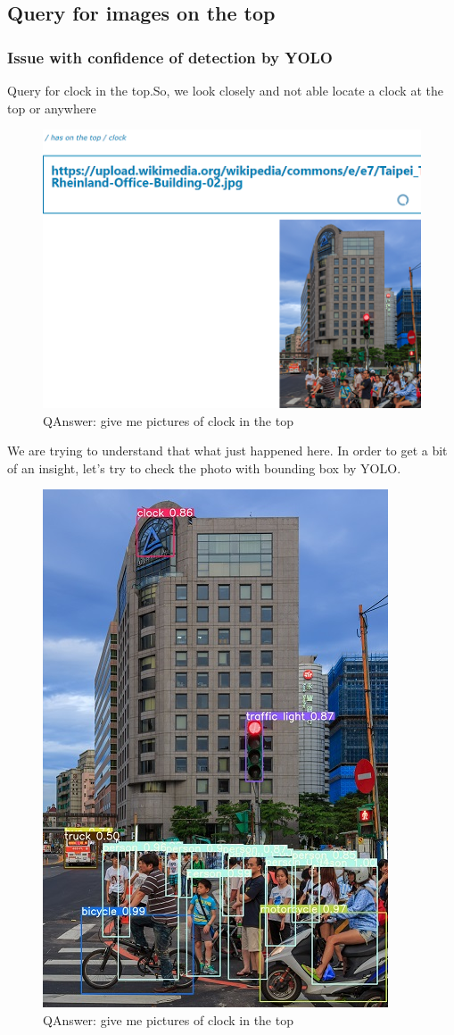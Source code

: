 \documentclass[12pt]{article}
\begin{document}
\subsection{Query for images on the top}
\subsubsection{Issue with confidence of detection by YOLO}
Query for clock in the top.So, we look closely and not able locate a clock at the top or anywhere
\begin{figure}[!h]
\center
\includegraphics{top.PNG}
\caption{QAnswer: give me pictures of clock  in the top}
\end{figure}
\newpage
We are trying to understand that what just happened here. In order to get a bit of an insight, let's try to check the photo with bounding box by YOLO.
\begin{figure}[!h]
\center
\includegraphics{bounding.jpg}
\caption{QAnswer: give me pictures of clock  in the top}
\end{figure}
\end{document}
